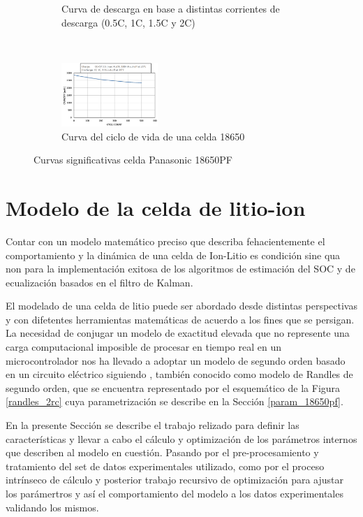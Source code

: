 \documentclass[10pt, a4paper]{report}
\begin{document}
\begin{figure}[h!]
\begin{subfigure}[t]{.5\textwidth}
	\caption{Curva de descarga en base a distintas corrientes de descarga (0.5C,
	1C, 1.5C y 2C)}
	\label{descarga_18650}
    \end{subfigure}
    ~ 
    \begin{centering}
	\begin{subfigure}[t]{1\textwidth}
	    \centering
	    \includegraphics[width=0.4\textwidth]{life_cycle_18650.png}
	    \caption{Curva del ciclo de vida de una celda 18650}
        \label{life_cycle_18650}
	\end{subfigure}
    \end{centering}
    \caption{Curvas significativas celda Panasonic 18650PF}
    \label{curvas_sign_18650}
\end{figure}
\FloatBarrier


\section{Modelo de la celda de litio-ion}\label{dev_batt_model}

Contar con un modelo matemático preciso que describa fehacientemente el
comportamiento y la dinámica de una celda de Ion-Litio es condición sine qua non
para la implementación exitosa de los algoritmos de estimación del
\acrshort{SOC} y de ecualización basados en el filtro de Kalman.

El modelado de una celda de litio puede ser abordado desde distintas
perspectivas y con difetentes herramientas matemáticas de acuerdo a los fines
que se persigan. La necesidad de conjugar un modelo de exactitud elevada que no
represente una carga computacional imposible de procesar en tiempo real en un
microcontrolador nos ha llevado a adoptar un modelo de segundo orden basado en
un circuito eléctrico siguiendo \cite{spagnol_kalman}, también conocido como
modelo de Randles de segundo orden, que se encuentra representado por el
esquem\'atico de la Figura \ref{randles_2rc} cuya parametrizaci\'on se describe
en la Secci\'on \ref{param_18650pf}.

En la presente Sección se describe el trabajo relizado para definir las
características y llevar a cabo el cálculo y optimización de los parámetros
internos que describen al modelo en cuestión. Pasando por el pre-procesamiento y
tratamiento del set de datos experimentales utilizado, como por el proceso
intrínseco de cálculo y posterior trabajo recursivo de optimización para ajustar
los parámertros y así el comportamiento del modelo a los datos experimentales
validando los mismos.
\end{document}
